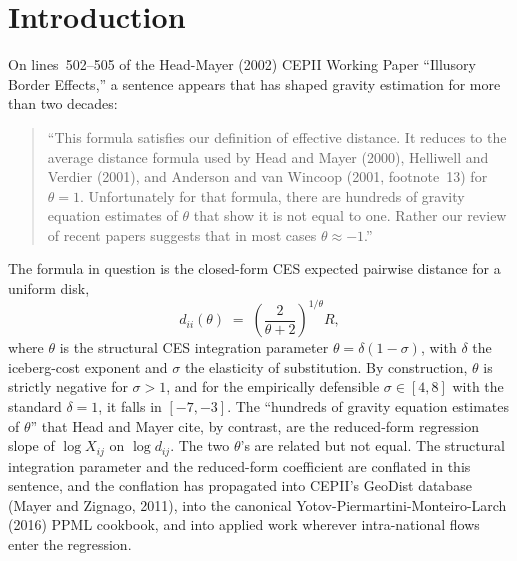 \documentclass[11pt, letterpaper]{article}
\theoremstyle{definition}
\newcommand{\dii}{d_{ii}}
\begin{document}
\section{Introduction}
\label{sec:intro}

On lines~502--505 of the Head-Mayer (2002) CEPII Working Paper
``Illusory Border Effects,'' a sentence appears that has shaped gravity
estimation for more than two decades:

\begin{quote}
``This formula satisfies our definition of effective distance. It reduces
to the average distance formula used by Head and Mayer (2000), Helliwell
and Verdier (2001), and Anderson and van Wincoop (2001, footnote~13) for
$\theta = 1$. Unfortunately for that formula, there are hundreds of
gravity equation estimates of $\theta$ that show it is not equal to one.
Rather our review of recent papers suggests that in most cases
$\theta \approx -1$.''
\end{quote}

The formula in question is the closed-form CES expected pairwise distance
for a uniform disk,
\begin{equation}
\label{eq:hm-closed-form}
\dii(\theta) \;=\; \left(\frac{2}{\theta + 2}\right)^{1/\theta} R,
\end{equation}
where $\theta$ is the structural CES integration parameter
$\theta = \delta(1 - \sigma)$, with $\delta$ the iceberg-cost exponent
and $\sigma$ the elasticity of substitution. By construction, $\theta$
is strictly negative for $\sigma > 1$, and for the empirically
defensible $\sigma \in [4, 8]$ with the standard $\delta = 1$, it falls
in $[-7, -3]$. The ``hundreds of gravity equation estimates of $\theta$''
that Head and Mayer cite, by contrast, are the reduced-form regression
slope of $\log X_{ij}$ on $\log d_{ij}$. The two $\theta$'s are
related but not equal. The structural integration parameter and the
reduced-form coefficient are conflated in this sentence, and the
conflation has propagated into CEPII's GeoDist database (Mayer and
Zignago, 2011), into the canonical Yotov-Piermartini-Monteiro-Larch
(2016) PPML cookbook, and into applied work wherever intra-national
flows enter the regression.
\end{document}
